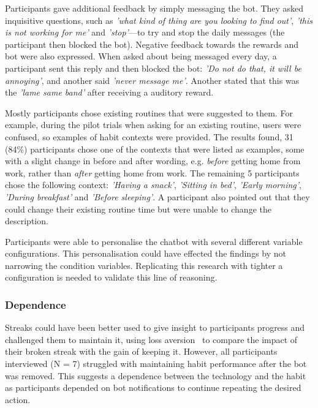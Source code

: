 Participants gave additional feedback by simply messaging the bot. They asked inquisitive questions, such as \textit{'what kind of thing are you looking to find out'}, \textit{'this is not working for me'} and \textit{'stop'}---to try and stop the daily messages (the participant then blocked the bot). Negative feedback towards the rewards and bot were also expressed. When asked about being messaged every day, a participant sent this reply and then blocked the bot: \textit{'Do not do that, it will be annoying'}, and another said \textit{'never message me'}. Another stated that this was the \textit{'lame same band'} after receiving a auditory reward.

Mostly participants chose existing routines that were suggested to them. For example, during the pilot trials when asking for an existing routine, users were confused, so examples of habit contexts were provided. The results found, 31 (84\%) participants chose one of the contexts that were listed as examples, some with a slight change in before and after wording, e.g. \textit{before} getting home from work, rather than \textit{after} getting home from work. The remaining 5 participants chose the following context: \textit{'Having a snack'}, \textit{'Sitting in bed'}, \textit{'Early morning'}, \textit{'During breakfast'} and \textit{'Before sleeping'}. A participant also pointed out that they could change their existing routine time but were unable to change the description.

Participants were able to personalise the chatbot with several different variable configurations. This personalisation could have effected the findings by not narrowing the condition variables. Replicating this research with tighter a configuration is needed to validate this line of reasoning.


\subsubsection*{Dependence}
Streaks could have been better used to give insight to participants progress and challenged them to maintain it, using loss aversion~\cite{loss_aversion} to compare the impact of their broken streak with the gain of keeping it. However, all participants interviewed (N = 7) struggled with maintaining habit performance after the bot was removed. This suggests a dependence between the technology and the habit as participants depended on bot notifications to continue repeating the desired action.


